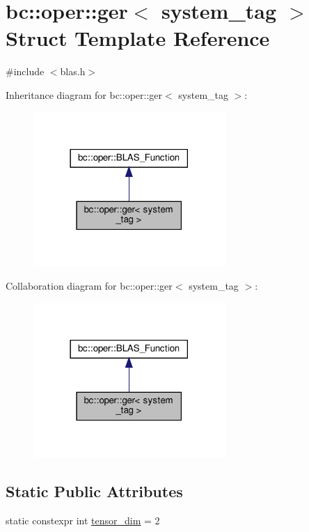 \hypertarget{structbc_1_1oper_1_1ger}{}\section{bc\+:\+:oper\+:\+:ger$<$ system\+\_\+tag $>$ Struct Template Reference}
\label{structbc_1_1oper_1_1ger}


{\ttfamily \#include $<$blas.\+h$>$}



Inheritance diagram for bc\+:\+:oper\+:\+:ger$<$ system\+\_\+tag $>$\+:\nopagebreak
\begin{figure}[H]
\begin{center}
\leavevmode
\includegraphics[width=206pt]{structbc_1_1oper_1_1ger__inherit__graph}
\end{center}
\end{figure}


Collaboration diagram for bc\+:\+:oper\+:\+:ger$<$ system\+\_\+tag $>$\+:\nopagebreak
\begin{figure}[H]
\begin{center}
\leavevmode
\includegraphics[width=206pt]{structbc_1_1oper_1_1ger__coll__graph}
\end{center}
\end{figure}
\subsection*{Static Public Attributes}
\begin{DoxyCompactItemize}
\item 
static constexpr int \hyperlink{structbc_1_1oper_1_1ger_a83b7b2f9097d8ada13047fa19de36f1a}{tensor\+\_\+dim} = 2
\end{DoxyCompactItemize}
